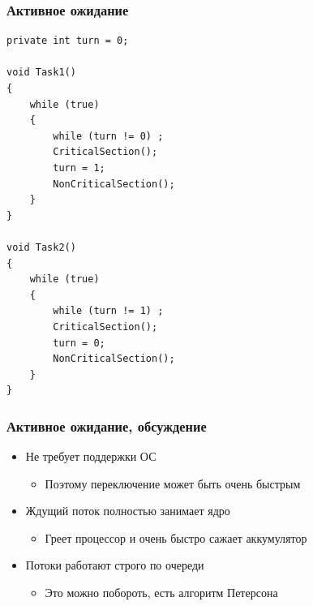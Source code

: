 \documentclass[xetex,mathserif,serif]{beamer}
\begin{document}
    \begin{frame}[fragile]
        \frametitle{Активное ожидание}
        \begin{scriptsize}
            \begin{verbatim}
private int turn = 0;

void Task1()
{
    while (true)
    {
        while (turn != 0) ;
        CriticalSection();
        turn = 1;
        NonCriticalSection();
    }
}

void Task2()
{
    while (true)
    {
        while (turn != 1) ;
        CriticalSection();
        turn = 0;
        NonCriticalSection();
    }
}
            \end{verbatim}
        \end{scriptsize}
    \end{frame}

    \begin{frame}
        \frametitle{Активное ожидание, обсуждение}
        \begin{itemize}
            \item Не требует поддержки ОС
            \begin{itemize}
                \item Поэтому переключение может быть очень быстрым
            \end{itemize}
            \item Ждущий поток полностью занимает ядро
            \begin{itemize}
                \item Греет процессор и очень быстро сажает аккумулятор
            \end{itemize}
            \item Потоки работают строго по очереди
            \begin{itemize}
                \item Это можно побороть, есть алгоритм Петерсона
            \end{itemize}
        \end{itemize}
    \end{frame}
\end{document}
